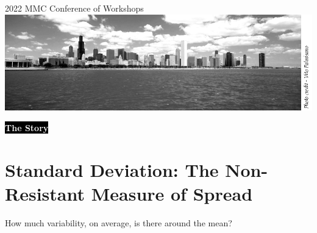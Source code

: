 \documentclass[9pt, oneside]{extarticle}     %
\begin{document}
\begin{titlepage}
  \vfill %
  \vspace{0.3\baselineskip} %
  2022 %
  {\large MMC Conference of Workshops}\\[.1in] %
  \includegraphics[width=\textwidth]{img/mmc_logo.png}
\end{titlepage}

\tableofcontents
\begin{centering}
  \date{\today}
\end{centering}


\newpage



\colorbox{black}{{\bf \textcolor{white}{\textsf{The Story}}}}\\

\section{Standard Deviation: The Non-Resistant Measure of Spread}

How much variability, on average, is there around the mean?
\end{document}
